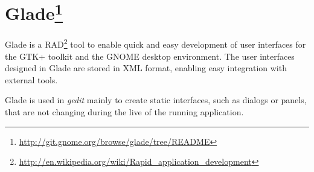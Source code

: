 
\section[Glade]{Glade\footnote{\url{http://git.gnome.org/browse/glade/tree/README}}}\label{sec:Glade}

Glade is a RAD\footnote{\url{http://en.wikipedia.org/wiki/Rapid_application_development}} tool to enable quick and easy development of user interfaces for the GTK+ toolkit and the GNOME desktop environment. The user interfaces designed in Glade are stored in XML format, enabling easy integration with external tools.

Glade is used in \emph{gedit} mainly to create static interfaces, such as dialogs or panels, that are not changing during the live of the running application.
